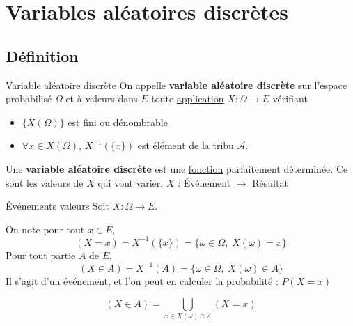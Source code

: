 \chapter{Variables aléatoires discrètes} %
\label{chap: Variables aléatoires discrètes}

\section{Définition} %
\label{sec:Définition}

\begin{Definition}[colbacktitle=red!75!black]{Variable aléatoire discrète}{}
On appelle \textbf{variable aléatoire discrète} sur l'espace probabilisé $\Omega$ et à valeurs dans $E$ toute \underline{application} $X : \Omega \to E$ vérifiant 
\begin{itemize}

  \item $\{X(\Omega)\}$ est fini ou dénombrable 
  \item $\forall x \in X(\Omega)$, $X ^{-1}(\{x\})$ est élément de la tribu $\mathcal{A}$.

\end{itemize}

\end{Definition}

\begin{note}{}{}
Une \textbf{variable aléatoire discrète} est une \underline{fonction} parfaitement déterminée. Ce sont les valeurs de $X$ qui vont varier.
\center 
$X$ : {Événement} $\to$ {Résultat}
\end{note}

\begin{Definition}[colbacktitle=red!75!black]{Événements valeurs}{}
Soit $X : \Omega \to E$. 

On note pour tout $x \in E$,
\begin{equation}
(X =x) = X ^{-1}(\{x\}) = \{ \omega \in \Omega, \; X(\omega) = x \}
\end{equation}
Pour tout partie $A$ de $E$,
\begin{equation}
  (X \in A) = X ^{-1}(A) = \{ \omega \in \Omega, \; X(\omega)\in A\}
\end{equation}
Il s'agit d'un événement, et l'on peut en calculer la probabilité : $P(X=x)$

\end{Definition}


\begin{Prop}{}{}
\begin{equation}
  (X \in A) = \bigcup _{x \in X(\omega) \cap A} (X=x)
\end{equation}
\end{Prop}


